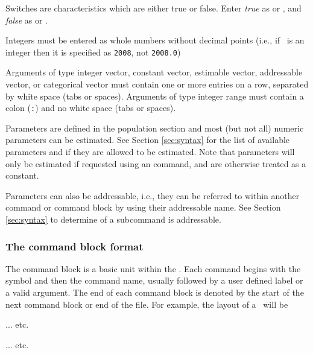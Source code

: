 Switches are characteristics which are either true or false. Enter \emph{true} as  or , and \emph{false} as  or .

Integers must be entered as whole numbers without decimal points (i.e., if \ is an integer then it is specified as \texttt{2008}, not \texttt{2008.0})

Arguments of type integer vector, constant vector, estimable vector, addressable vector, or categorical vector must contain one or more entries on a row, separated by white space (tabs or spaces). Arguments of type integer range must contain a colon (\texttt{:}) and no white space (tabs or spaces).

Parameters are defined in the population section and most (but not all) numeric parameters can be estimated. See Section \ref{sec:syntax} for the list of available parameters and if they are allowed to be estimated. Note that parameters will only be estimated if requested using an  command, and are otherwise treated as a constant.

Parameters can also be addressable, i.e., they can be referred to within another command or command block by using their addressable name. See Section \ref{sec:syntax} to determine of a subcommand is addressable.

\subsubsection{The command block format}\label{sec:CommandBlockFormat}

The command block is a basic unit within the \config. Each command begins with the symbol \command{} and then the command name, usually followed by a user defined label or a valid argument. The end of each command block is denoted by the start of the next command block or end of the file. For example, the layout of a \config\ will be

\begin{description}
	\item {} 
	\item {} 
	\item {} 
	\item ... etc.
	\item {} 
	\item {} 
	\item {} 
	\item ... etc.
\end{description}

